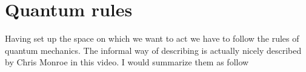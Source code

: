 \section{Quantum rules}
Having set up the space on which we want to act we have to follow the rules of quantum mechanics. The informal way of describing is actually nicely described by Chris Monroe in this video. I would summarize them as follow